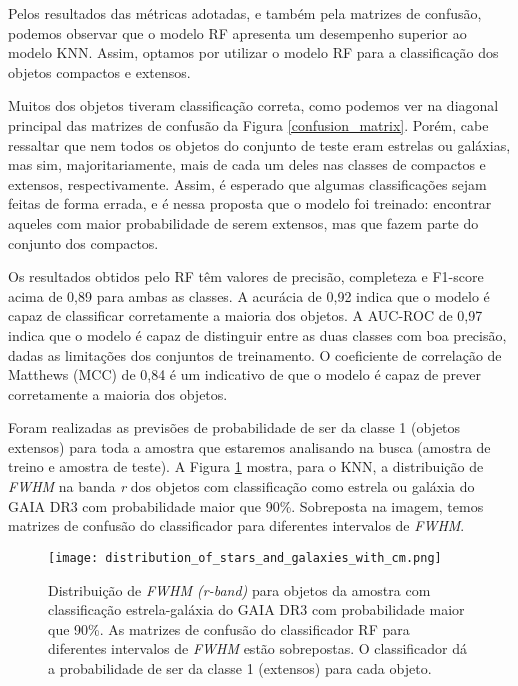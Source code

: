 Pelos resultados das métricas adotadas, e também pela matrizes de confusão, podemos observar que o modelo RF apresenta um desempenho superior ao modelo KNN. Assim, optamos por utilizar o modelo RF para a classificação dos objetos compactos e extensos.

Muitos dos objetos tiveram classificação correta, como podemos ver na diagonal principal das matrizes de confusão da Figura \ref{confusion_matrix}. Porém, cabe ressaltar que nem todos os objetos do conjunto de teste eram estrelas ou galáxias, mas sim, majoritariamente, mais de cada um deles nas classes de compactos e extensos, respectivamente. Assim, é esperado que algumas classificações sejam feitas de forma errada, e é nessa proposta que o modelo foi treinado: encontrar aqueles com maior probabilidade de serem extensos, mas que fazem parte do conjunto dos compactos.

Os resultados obtidos pelo RF têm valores de precisão, completeza e F1-score acima de 0,89 para ambas as classes. A acurácia de 0,92 indica que o modelo é capaz de classificar corretamente a maioria dos objetos. A AUC-ROC de 0,97 indica que o modelo é capaz de distinguir entre as duas classes com boa precisão, dadas as limitações dos conjuntos de treinamento. O coeficiente de correlação de Matthews (MCC) de 0,84 é um indicativo de que o modelo é capaz de prever corretamente a maioria dos objetos.

Foram realizadas as previsões de probabilidade de ser da classe 1 (objetos extensos) para toda a amostra que estaremos analisando na busca (amostra de treino e amostra de teste). A Figura \ref{probabilidade_extensos_fwhm} mostra, para o KNN, a distribuição de \textit{FWHM} na banda \textit{r} dos objetos com classificação como estrela ou galáxia do GAIA DR3 com probabilidade maior que 90\%. Sobreposta na imagem, temos matrizes de confusão do classificador para diferentes intervalos de \textit{FWHM}.

\begin{figure}[!ht]
    \centering
    \texttt{[image: distribution\_of\_stars\_and\_galaxies\_with\_cm.png]}
    \caption[]{Distribuição de \textit{FWHM (r-band)} para objetos da amostra com classificação estrela-galáxia do GAIA DR3 com probabilidade maior que 90\%. As matrizes de confusão do classificador RF para diferentes intervalos de \textit{FWHM} estão sobrepostas. O classificador dá a probabilidade de ser da classe 1 (extensos) para cada objeto. }
    \label{probabilidade_extensos_fwhm}
\end{figure}


